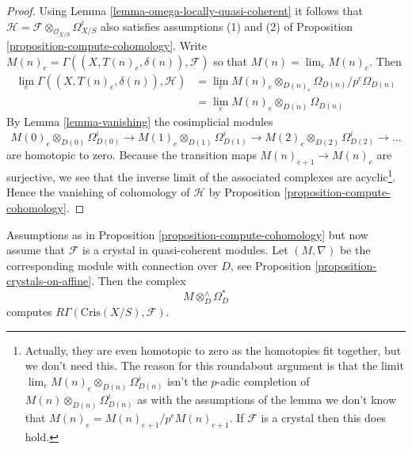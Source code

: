 \begin{proof}
Using Lemma \ref{lemma-omega-locally-quasi-coherent} it follows that
$\mathcal{H} = \mathcal{F} \otimes_{\mathcal{O}_{X/S}} \Omega^i_{X/S}$
also satisfies assumptions (1) and (2) of
Proposition \ref{proposition-compute-cohomology}.
Write $M(n)_e = \Gamma((X, T(n)_e, \delta(n)), \mathcal{F})$
so that $M(n) = \lim_e M(n)_e$. Then
\begin{align*}
\lim_e \Gamma((X, T(n)_e, \delta(n)), \mathcal{H}) & =
\lim_e M(n)_e \otimes_{D(n)_e} \Omega_{D(n)}/p^e\Omega_{D(n)} \\
& = \lim_e M(n)_e \otimes_{D(n)} \Omega_{D(n)}
\end{align*}
By
Lemma \ref{lemma-vanishing}
the cosimplicial modules
$$
M(0)_e \otimes_{D(0)} \Omega^i_{D(0)} \to
M(1)_e \otimes_{D(1)} \Omega^i_{D(1)} \to
M(2)_e \otimes_{D(2)} \Omega^i_{D(2)} \to \ldots
$$
are homotopic to zero. Because the transition maps
$M(n)_{e + 1} \to M(n)_e$ are surjective, we see that
the inverse limit of the associated complexes are acyclic\footnote{Actually,
they are even homotopic to zero as the homotopies fit together, but we don't
need this. The reason for this roundabout argument is that
the limit $\lim_e M(n)_e \otimes_{D(n)} \Omega^i_{D(n)}$ isn't the
$p$-adic completion of $M(n) \otimes_{D(n)} \Omega^i_{D(n)}$ as with
the assumptions of the lemma we don't know that
$M(n)_e = M(n)_{e + 1}/p^eM(n)_{e + 1}$. If $\mathcal{F}$ is a crystal
then this does hold.}.
Hence the vanishing of cohomology of $\mathcal{H}$ by
Proposition \ref{proposition-compute-cohomology}.
\end{proof}

\begin{proposition}
\label{proposition-compute-cohomology-crystal}
Assumptions as in Proposition \ref{proposition-compute-cohomology}
but now assume that $\mathcal{F}$ is a crystal in quasi-coherent modules.
Let $(M, \nabla)$ be the corresponding module with connection over $D$, see
Proposition \ref{proposition-crystals-on-affine}. Then the complex
$$
M \otimes^\wedge_D \Omega^*_D
$$
computes $R\Gamma(\text{Cris}(X/S), \mathcal{F})$.
\end{proposition}

